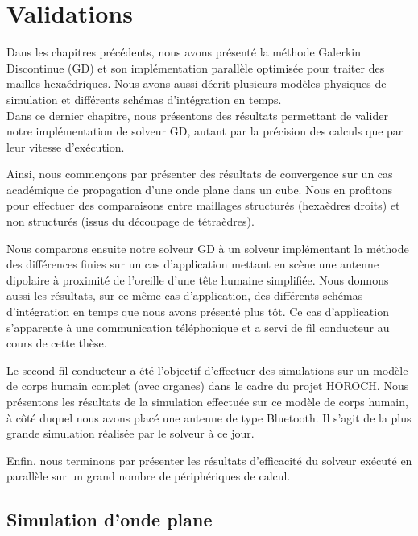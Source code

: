 \chapter{Validations}
\label{chap:validation}

Dans les chapitres précédents, nous avons présenté la méthode
Galerkin Discontinue (GD)
et son implémentation parallèle optimisée pour traiter des mailles
hexaédriques. Nous avons aussi décrit plusieurs modèles physiques de
simulation et différents schémas d'intégration en temps.
\\

Dans ce dernier chapitre, nous présentons des résultats
permettant de valider notre implémentation de solveur GD, autant
par la précision des calculs que par leur vitesse d'exécution.

Ainsi, nous commençons par présenter des résultats de convergence
sur un cas académique de propagation d'une onde plane dans un cube.
Nous en profitons pour effectuer des comparaisons entre maillages
structurés (hexaèdres droits) et non structurés (issus du découpage de
tétraèdres).

Nous comparons ensuite notre solveur GD à un solveur implémentant
la méthode des différences finies sur un cas d'application
mettant en scène une antenne dipolaire à proximité de l'oreille d'une tête
humaine simplifiée. Nous donnons aussi les résultats, sur ce même cas d'application,
des différents schémas d'intégration en temps que nous avons présenté plus tôt.
Ce cas d'application s'apparente à une communication
téléphonique et a servi de fil conducteur au cours de cette thèse.

Le second fil conducteur a été l'objectif d'effectuer des simulations
sur un modèle de corps humain complet (avec organes) dans le cadre du projet HOROCH.
Nous présentons les résultats de la simulation effectuée sur ce modèle
de corps humain, à côté duquel nous avons placé
une antenne de type Bluetooth.
Il s'agit de la plus grande simulation réalisée par le solveur à ce jour.

Enfin, nous terminons par présenter les résultats d'efficacité du solveur
exécuté en parallèle sur un grand nombre de périphériques de calcul.
\\


\section{Simulation d'onde plane}
\label{sect:valid_onde_plane}

